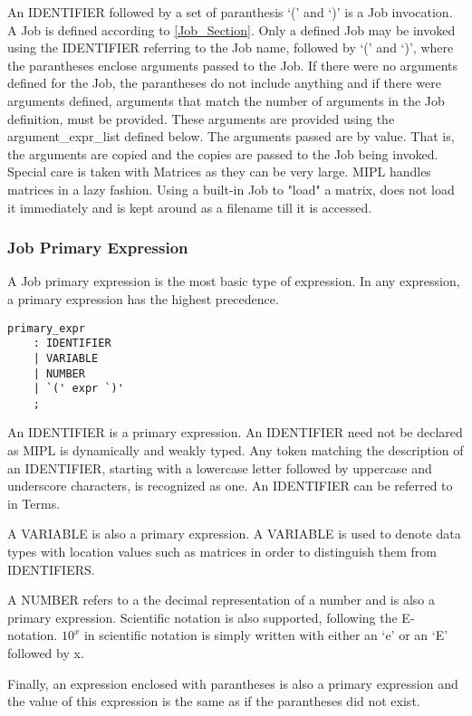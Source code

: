 \documentclass[prodmode,acmtecs]{acmsmall}
\begin{document}
An IDENTIFIER followed by a set of paranthesis `(' and `)' is a Job
invocation. A Job is defined according to \ref{Job_Section}. Only a defined
Job may be invoked using the IDENTIFIER referring to the Job name,
followed by `(' and `)', where the parantheses enclose arguments passed
to the Job. If there were no arguments defined for the Job, the
parantheses do not include anything and if there were arguments defined, 
arguments that match the number of arguments in the Job definition, must
be provided. These arguments are provided using the argument\_expr\_list 
defined below. The arguments passed are by value. That is, the arguments 
are copied and the copies are passed to the Job being invoked. Special
care is taken with Matrices as they can be very large. MIPL handles 
matrices in a lazy fashion. Using a built-in Job to "load" a matrix, 
does not load it immediately and is kept around as a filename till it is
accessed.
\medskip

\subsubsection{Job Primary Expression}

A Job primary expression is the most basic type of expression. In any
expression, a primary expression has the highest precedence.

\begin{lstlisting}
primary_expr
	: IDENTIFIER
	| VARIABLE
	| NUMBER
	| `(' expr `)'
	;
\end{lstlisting}

An IDENTIFIER is a primary expression. An IDENTIFIER need not be declared
as MIPL is dynamically and weakly typed. Any token matching the description
of an IDENTIFIER, starting with a lowercase letter followed by uppercase and
underscore characters, is recognized as one. An IDENTIFIER can be referred to
in Terms.

A VARIABLE is also a primary expression. A VARIABLE is used to denote 
data types with location values such as matrices in order to distinguish them 
from IDENTIFIERS.

A NUMBER refers to a the decimal representation of a number and is also a 
primary expression. Scientific notation is also supported, following the 
E-notation. $10^{x}$ in scientific notation is simply written with either an
`e' or an `E' followed by x.

Finally, an expression enclosed with parantheses is also a primary expression 
and the value of this expression is the same as if the parantheses did not 
exist.
\medskip
\end{document}
